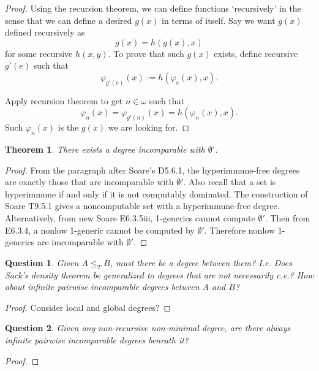 \documentclass{article}
\newtheorem{theorem}{Theorem}[subsection]
\newtheorem{question}{Question}[subsection]
\begin{document}
\begin{proof}
      Using the recursion theorem, we can define functions `recursively' in
      the sense that we can define a desired $g(x)$ in terms of itself. Say
      we want $g(x)$ defined recursively as
      \[g(x)=h(g(x),x)\]
      for some recursive $h(x,y)$. To prove that such $g(x)$ exists,
      define recursive $g'(e)$ such that
      \[\varphi_{g'(e)}(x) :=h(\varphi_e(x),x).\]

      Apply recursion theorem to get $n\in\omega$ such that
      \[\varphi_n(x) =\varphi_{g'(n)}(x) =h(\varphi_n(x),x).\]
      Such $\varphi_n(x)$ is the $g(x)$ we are looking for.
    \end{proof}

    \begin{theorem}
      There exists a degree incomparable with $\emptyset'$.
    \end{theorem}
    \begin{proof}
      From the paragraph after Soare's D5.6.1, the hyperimmune-free degrees
      are exactly those that are incomparable with $\emptyset'$. Also
      recall that a set is hyperimmune if and only if it is not computably
      dominated. The construction of Soare T9.5.1 gives a noncomputable set
      with a hyperimmune-free degree. \\

      Alternatively, from new Soare E6.3.5iii, 1-generics cannot compute
      $\emptyset'$. Then from E6.3.4, a nonlow 1-generic cannot be computed
      by $\emptyset'$. Therefore nonlow 1-generics are imcomparable with
      $\emptyset'$.
    \end{proof}

    \begin{question}
      Given $A\leq_T B$, must there be a degree between them? I.e. Does
      Sack's density theorem be generalized to degrees that are not
      necessarily c.e.? How about infinite pairwise incomparable degrees
      between $A$ and $B$?
    \end{question}
    \begin{proof}
      Consider local and global degrees?
    \end{proof}

    \begin{question}
      Given any non-recursive non-minimal degree, are there always infinite
      pairwise incomparable degrees beneath it?
    \end{question}
    \begin{proof}
    \end{proof}
\end{document}
